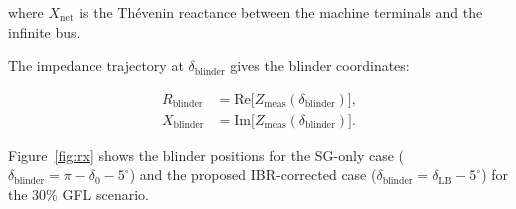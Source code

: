 \documentclass[11pt,a4paper]{article}
\newcommand{\dz}{\delta_0}         %
\newcommand{\dlb}{\delta_{\mathrm{LB}}}   %
\begin{document}
where $X_{\mathrm{net}}$ is the Th\'evenin reactance between the machine
terminals and the infinite bus.

The impedance trajectory at $\delta_{\mathrm{blinder}}$ gives the
blinder coordinates:

\begin{align}
  R_{\mathrm{blinder}} &= \mathrm{Re}\bigl[Z_{\mathrm{meas}}
                          (\delta_{\mathrm{blinder}})\bigr], \\
  X_{\mathrm{blinder}} &= \mathrm{Im}\bigl[Z_{\mathrm{meas}}
                          (\delta_{\mathrm{blinder}})\bigr].
\end{align}

Figure~\ref{fig:rx} shows the blinder positions for the SG-only case
($\delta_{\mathrm{blinder}} = \pi - \dz - 5^\circ$) and the proposed
IBR-corrected case ($\delta_{\mathrm{blinder}} = \dlb - 5^\circ$) for the
30\% GFL scenario.
\end{document}
